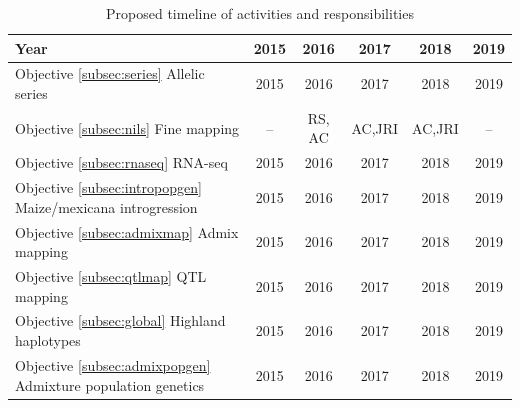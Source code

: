 









\begin{table}[H]
\begin{center}
\caption{Proposed timeline of activities and responsibilities}\label{tab:timeline}
\begin{tabular}{lccccc}\\\toprule  
    \rowcolor{gray!50}
Year & 2015 & 2016 & 2017 & 2018 & 2019 \\\midrule
Objective \ref{subsec:series} Allelic series & 2015 & 2016 & 2017 & 2018 & 2019\\\midrule
Objective \ref{subsec:nils} Fine mapping & -- & RS, AC & AC,JRI & AC,JRI & -- \\\midrule
Objective \ref{subsec:rnaseq} RNA-seq & 2015 & 2016 & 2017 & 2018 & 2019\\\midrule
Objective \ref{subsec:intropopgen} Maize/mexicana introgression & 2015 & 2016 & 2017 & 2018 & 2019 \\\midrule
Objective \ref{subsec:admixmap} Admix mapping & 2015 & 2016 & 2017 & 2018 & 2019 \\\midrule
Objective \ref{subsec:qtlmap} QTL mapping & 2015 & 2016 & 2017 & 2018 & 2019 \\\midrule
Objective \ref{subsec:global} Highland haplotypes & 2015 & 2016 & 2017 & 2018 & 2019 \\\midrule
Objective \ref{subsec:admixpopgen} Admixture population genetics & 2015 & 2016 & 2017 & 2018 & 2019\\ \bottomrule
\end{tabular}
\end{center}
\end{table} 


